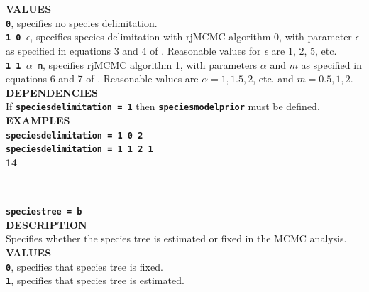 \documentclass{book}
\numberwithin{equation}{section} \renewcommand{\baselinestretch}{0.55}
\begin{document}
\textbf{VALUES} \vspace{5pt}\\
\textbf{\texttt{0}}, specifies no species delimitation. \vspace{5pt}\\
\textbf{\texttt{1 0 $\epsilon$}}, specifies species delimitation with rjMCMC algorithm 0, with parameter $\epsilon$ as specified in equations 3 and 4 of \cite{Yang2010}.  Reasonable values for $\epsilon$ are 1, 2, 5, etc. \vspace{5pt}\\
\textbf{\texttt{1 1 $\alpha$ m}}, specifies rjMCMC algorithm 1, with
parameters $ \alpha$ and $m$ as specified in equations 6 and 7 of
\cite{Yang2010}. Reasonable values are $\alpha = 1, 1.5, 2$, etc. and $m = 0.5, 1, 2$. \vspace{5pt}\\
\textbf{DEPENDENCIES} \vspace{5pt}\\
If \textbf{\texttt{speciesdelimitation = 1}} then \textbf{\texttt{speciesmodelprior}} must be defined. \vspace{5pt}\\
\textbf{EXAMPLES} \vspace{5pt}\\
\textbf{\texttt{speciesdelimitation = 1 0 2}} \vspace{5pt}\\
\textbf{\texttt{speciesdelimitation = 1 1 2 1}}\vspace{10pt}\\
\textbf{{\large 14}} \\
\noindent\rule{\textwidth}{0.8pt} \\
\textbf{{\Large \texttt{speciestree = b}}} \vspace{5pt}\\
\textbf{DESCRIPTION} \vspace{5pt}\\
Specifies whether the species tree is estimated or fixed in the MCMC
analysis.
\vspace{5pt}\\
\textbf{VALUES} \vspace{5pt}\\
\textbf{\texttt{0}}, specifies that species tree is fixed.  \vspace{5pt}\\
\textbf{\texttt{1}}, specifies that species tree is estimated. \vspace{5pt}\\
\end{document}
